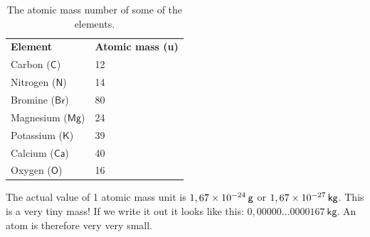  
          \begin{table}[H]
        \begin{center}
      \label{m38756*uid8}
    \noindent
      \tablelasttail{}
      \begin{xtabular}[t]{|l|l|}\hline
                  \textbf{Element}
                 &
                  \textbf{Atomic mass (u)}
     \tabularnewline{}
        Carbon ($\mathsf{C}$) &
        12%
     \tabularnewline{}
        Nitrogen ($\mathsf{N}$) &
        14%
     \tabularnewline{}
        Bromine ($\mathsf{Br}$) &
        80%
     \tabularnewline{}
        Magnesium ($\mathsf{Mg}$) &
        24%
     \tabularnewline{}
        Potassium ($\mathsf{K}$) &
        39%
     \tabularnewline{}
        Calcium ($\mathsf{Ca}$) &
        40%
     \tabularnewline{}
        Oxygen ($\mathsf{O}$) &
        16%
     \tabularnewline{}
    \end{xtabular}
      \end{center}
    \caption{The atomic mass number of some of the elements.}
\label{tab:atomic mass}
\end{table}
    \par
        \label{m38756*id255096}The actual value of 1 atomic mass unit is $1,67\ensuremath{\times}{10}^{-24}\phantom{\rule{2pt}{0ex}}\mathsf{g}$ or $1,67\ensuremath{\times}{10}^{-27}\phantom{\rule{2pt}{0ex}}\mathsf{kg}$. This is a very tiny mass! If we write it out it looks like this: $0,00000...0000167~\mathsf{kg}$. An atom is therefore very very small.\par 
\label{m38756*eip-320}
